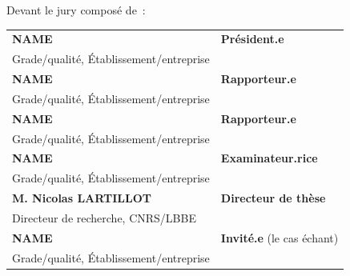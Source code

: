 Devant le jury composé de~:\\

\small {
	\begin{tabular}{ll}
		\textbf{NAME}           &\textbf{Président.e}\\
		Grade/qualité, Établissement/entreprise\\
		\textbf{NAME}           &\textbf{Rapporteur.e}\\
		Grade/qualité, Établissement/entreprise\\
		\textbf{NAME}           &\textbf{Rapporteur.e}\\
		Grade/qualité, Établissement/entreprise\\
		\textbf{NAME}           &\textbf{Examinateur.rice}\\
		Grade/qualité, Établissement/entreprise\\
		\textbf{M. Nicolas LARTILLOT}           &\textbf{Directeur de thèse}\\
		Directeur de recherche, CNRS/LBBE\\	
		\textbf{NAME}     &\textbf{Invité.e} (le cas échant)\\
		Grade/qualité, Établissement/entreprise\\
	\end{tabular}
}
